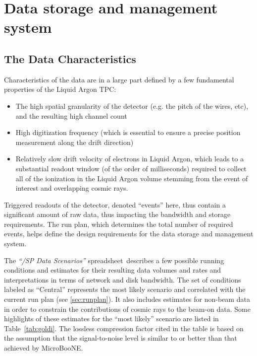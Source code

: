 \section{Data storage and management system}

\subsection{The \pd Data Characteristics}
Characteristics of the \pd data are in a large part defined by a few fundamental
properties of the \pd Liquid Argon TPC:
\begin{itemize}
\item The high spatial granularity of the detector (e.g. the pitch of the wires, etc), and the resulting high channel count
\item High digitization frequency (which is essential to ensure a precise position measurement along the drift direction)
\item Relatively slow drift velocity of electrons in Liquid Argon, which  leads to a substantial readout window (of the order of milliseconds) required to collect
all of the ionization in the Liquid Argon volume stemming from the event of interest and overlapping cosmic rays.
\end{itemize}

Triggered readouts of the detector, denoted ``events'' here, 
thus contain a significant amount of raw data, thus impacting the bandwidth and
storage requirements.   The run plan, which determines the total number of required events, 
helps define the design requirements for the data storage and management system.

The \textit{``\pd/SP Data Scenarios''} spreadsheet\,\cite{data_spreadsheet}  %
describes a few possible running conditions and estimates for their
resulting data volumes and rates and interpretations in terms of
network and disk bandwidth. The set of conditions labeled as ``Central'' represents the most likely scenario
and correlated with the current run plan (see \ref{sec:runplan}).
 It also includes estimates for non-beam
data in order to constrain the contributions of cosmic rays to the beam-on data.  Some highlights
of these estimates for the ``most likely'' scenario
are listed in Table~\ref{tab:goldi}. The lossless compression factor cited
in the table is based on the assumption that the signal-to-noise level 
is similar to or better than that achieved by MicroBooNE.

